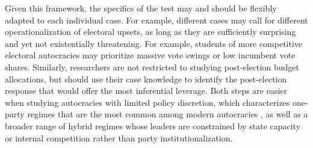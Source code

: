 \documentclass[12pt]{article}
\newcommand\fnote[1]{\footnote{\baselineskip=2\normalbaselineskip#1}}
\newcommand{\1}{\mathbbm{1}}
\let\footnote=\endnote
\begin{document}
Given this framework, the specifics of the test may and should be flexibly adapted to each individual case. For example, different cases may call for different operationalization of electoral upsets, as long as they are sufficiently surprising and yet not existentially threatening. For example, students of more competitive electoral autocracies may prioritize massive vote swings or low incumbent vote shares. Similarly, researchers are not restricted to studying post-election budget allocations, but should use their case knowledge to identify the post-election response that would offer the most inferential leverage. Both steps are easier when studying autocracies with limited policy discretion, which characterizes one-party regimes that are the most common among modern autocracies \parencite{MagaloniKricheli2010}, as well as a broader range of hybrid regimes whose leaders are constrained by state capacity or internal competition rather than party institutionalization.%


\end{document}
